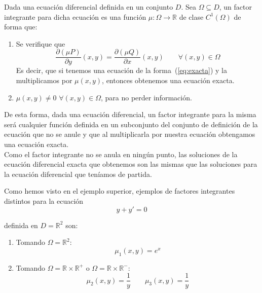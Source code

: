 \begin{definicion}
    Dada una ecuación diferencial definida en un conjunto $D$. Sea $\Omega\subseteq D$, un factor integrante para dicha ecuación es una función $\mu:\Omega\rightarrow\mathbb{R}$ de clase $C^1(\Omega)$ de forma que:
    \begin{enumerate}[label=\arabic*)]
        \item Se verifique que
            \begin{equation}\label{eq:condicion_fi}
                \dfrac{\partial (\mu P)}{\partial y}(x,y) = \dfrac{\partial (\mu Q)}{\partial x}(x,y) \qquad \forall (x,y)\in \Omega
            \end{equation}
            Es decir, que si tenemos una ecuación de la forma~(\ref{eq:exacta}) y la multiplicamos por $\mu(x,y)$, entonces obtenemos una ecuación exacta.
        \item$\mu(x,y)\neq 0$ $\forall (x,y)\in \Omega$, para no perder información.
    \end{enumerate}
\end{definicion}

\noindent
De esta forma, dada una ecuación diferencial, un factor integrante para la misma será cualquier función definida en un subconjunto del conjunto de definición de la ecuación que no se anule y que al multiplicarla por nuestra ecuación obtengamos una ecuación exacta.\\

Como el factor integrante no se anula en ningún punto, las soluciones de la ecuación diferencial exacta que obtenemos son las mismas que las soluciones para la ecuación diferencial que teníamos de partida.

\begin{ejemplo}
    Como hemos visto en el ejemplo superior, ejemplos de factores integrantes distintos para la ecuación 
    \begin{equation*}
        y + y' = 0
    \end{equation*}

    definida en $D=\mathbb{R}^2$ son:
    \begin{enumerate}
        \item Tomando $\Omega=\mathbb{R}^2$:
            \begin{equation*}
                \mu_1(x,y) = e^x
            \end{equation*}
        \item Tomando $\Omega=\mathbb{R}\times\mathbb{R}^+$ o $\Omega=\mathbb{R}\times \mathbb{R}^-$:
            \begin{equation*}
                \mu_2(x,y) = \dfrac{1}{y} \qquad \mu_3(x,y) = \dfrac{1}{y}
            \end{equation*}
    \end{enumerate}
\end{ejemplo}

